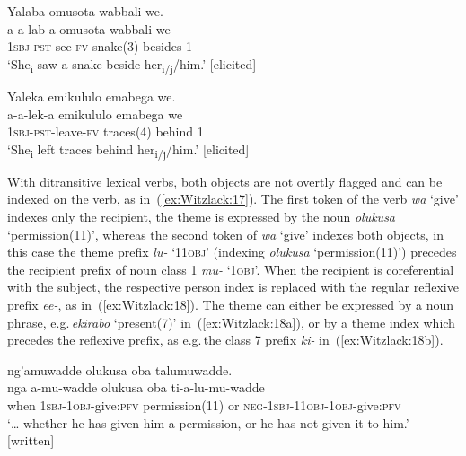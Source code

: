 \documentclass[output=paper,colorlinks,citecolor=brown,
]{langscibook}
\begin{document}
\ea\label{ex:Witzlack:14}

\ea \label{ex:Witzlack:14a}
    \glll Yalaba omusota wabbali we.\\
    a-a-lab-a omusota	wabbali	we\\
    \textsc{1sbj}-\textsc{pst}-see-\textsc{fv}	snake(3) besides	1\\
    \glt ‘She\textsubscript{i} saw a snake beside her\textsubscript{i/j}/him.’ [elicited]

\ex \label{ex:Witzlack:14b}
    \glll Yaleka emikululo emabega we.\\
    a-a-lek-a emikululo	emabega	we\\
    \textsc{1sbj}-\textsc{pst}-leave-\textsc{fv}	traces(4)		behind	1\\
    \glt ‘She\textsubscript{i} left traces behind her\textsubscript{i/j}/him.’ [elicited]
\z 
\z

With ditransitive lexical verbs, both objects are not overtly flagged and can be indexed on the verb, as in~(\ref{ex:Witzlack:17}). 
The first token of the verb \emph{wa} ‘give’ indexes only the recipient, the theme is expressed by the noun \emph{olukusa} ‘permission(11)’, whereas the second token of \emph{wa} ‘give’ indexes both objects, in this case the theme prefix \emph{lu-} ‘11\textsc{obj}’ (indexing \emph{olukusa} ‘permission(11)’) precedes the recipient prefix of noun class 1 \emph{mu-} ‘1\textsc{obj}’. 
When the recipient is coreferential with the subject, the respective person index is replaced with the regular reflexive prefix \emph{ee-}, as in~(\ref{ex:Witzlack:18}). 
The theme can either be expressed by a noun phrase, e.g.\,\emph{ekirabo} ‘present(7)’ in~(\ref{ex:Witzlack:18a}), or by a theme index which precedes the reflexive prefix, as e.g.\,the class 7 prefix \emph{ki-} in~(\ref{ex:Witzlack:18b}).

\ea
\label{ex:Witzlack:17}
 
    \glll […] ng’amuwadde olukusa oba talumuwadde.\\
    nga	a-mu-wadde	olukusa	oba	ti-a-lu-mu-wadde\\
    when \textsc{1sbj-1obj}-give:\textsc{pfv} permission(11)	or	\textsc{neg-1sbj-11obj-1obj}-give:\textsc{pfv}\\
    \glt ‘… whether he has given him a permission, or he has not given it to him.’ [written]%

\z 

\ea\label{ex:Witzlack:18}
\end{document}
